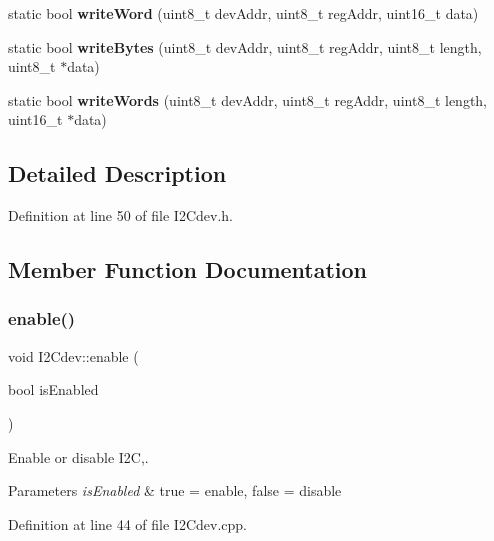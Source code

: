 \begin{DoxyCompactItemize}
static bool {\bfseries write\+Word} (uint8\+\_\+t dev\+Addr, uint8\+\_\+t reg\+Addr, uint16\+\_\+t data)
\item 
\mbox{\label{classI2Cdev_aa4e39cac6c0eac5112f9132084bcc93e}} 
static bool {\bfseries write\+Bytes} (uint8\+\_\+t dev\+Addr, uint8\+\_\+t reg\+Addr, uint8\+\_\+t length, uint8\+\_\+t $\ast$data)
\item 
\mbox{\label{classI2Cdev_aae37c0526e4b4730a5b2ffd752fd8b21}} 
static bool {\bfseries write\+Words} (uint8\+\_\+t dev\+Addr, uint8\+\_\+t reg\+Addr, uint8\+\_\+t length, uint16\+\_\+t $\ast$data)
\end{DoxyCompactItemize}


\subsection{Detailed Description}


Definition at line 50 of file I2\+Cdev.\+h.



\subsection{Member Function Documentation}
\mbox{\label{classI2Cdev_ab1fc6fb228f54f717cf317646a5751fc}} 
\subsubsection{\texorpdfstring{enable()}{enable()}}
{\footnotesize\ttfamily void I2\+Cdev\+::enable (\begin{DoxyParamCaption}\item[{bool}]{is\+Enabled }\end{DoxyParamCaption})\hspace{0.3cm}{\ttfamily [static]}}



Enable or disable I2C,. 


\begin{DoxyParams}{Parameters}
{\em is\+Enabled} & true = enable, false = disable \\
\hline
\end{DoxyParams}


Definition at line 44 of file I2\+Cdev.\+cpp.

